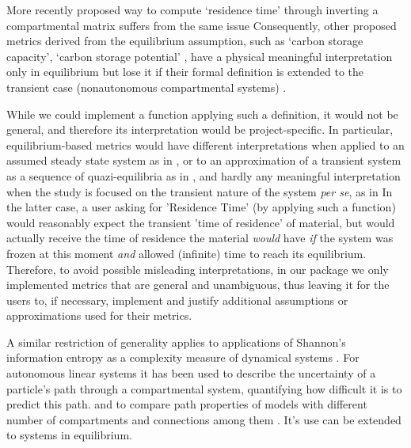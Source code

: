 More recently proposed way to compute `residence time' through inverting a compartmental matrix \cite{Xia2013GCB, Luo2017Biogeosciences, Luo2022, luo_land_2022} suffers from the same issue \cite{Sierra2016GlobChangBiol}  
Consequently, other proposed metrics derived from the equilibrium assumption, such as `carbon storage capacity', `carbon storage potential' \cite{Luo2017Biogeosciences, Huang2017GCB, zhou_traceability_2021, LiaoDisentangling2022, Luo2022, luo_land_2022},
have a physical meaningful interpretation only in equilibrium but lose it if their formal definition is extended to the transient case (nonautonomous compartmental systems) \cite{Sierra2018JAMES}.

While we could implement a function applying such a definition, it would not be general, and therefore its interpretation would be project-specific.
In particular, equilibrium-based metrics would have different interpretations when applied to an assumed steady state system as in \cite{Xia2013GCB}, or to an approximation of a transient system as a sequence of quazi-equilibria as in
\cite{Koven2015Biogeosciences, osullivan_process-oriented_2022}, and hardly any meaningful interpretation when the study is focused on the transient nature of the system \textit{per se}, as in \cite{Luo2017Biogeosciences} 
In the latter case, a user asking for 'Residence Time' (by applying such a function) would reasonably expect the transient 'time of residence' of material, but would actually receive the time of residence the material  
\emph{would} have \emph{if} the system was frozen at this moment \emph{and} allowed (infinite) time to reach its equilibrium. Therefore, to avoid possible misleading interpretations, in our package we only implemented metrics 
that are general and unambiguous, thus leaving it for the users to, if necessary, implement and justify additional assumptions or approximations used for their metrics. 

A similar restriction of generality applies to applications of Shannon's information entropy as a complexity measure 
of dynamical systems \cite{Ebeling1998}. 
For 
autonomous linear systems it has 
been used to describe the uncertainty of a particle's path through a
compartmental system, quantifying how difficult it is to predict this path. 
and to compare path properties of models with different number of
compartments and connections among them \cite{Metzler2020}. 
It's use can be extended to systems in equilibrium.

